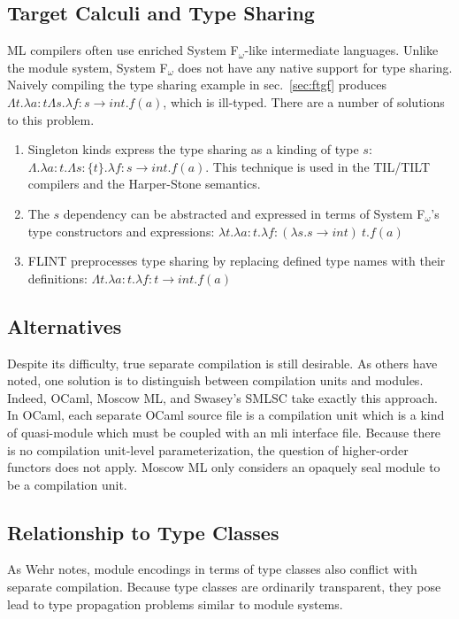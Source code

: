 \subsection{Target Calculi and Type Sharing}
ML compilers often use enriched System F$_\omega$-like intermediate languages. Unlike the module system, System F$_\omega$ does not have any native support for type sharing. Naively compiling the type sharing example in sec.~\ref{sec:ftgf} produces $\Lambda t. \lambda a:t \Lambda s.\lambda f:s\rightarrow int. f(a)$, which is ill-typed. There are a number of solutions to this problem. 
\begin{enumerate}
\item Singleton kinds express the type sharing as a kinding of type $s$: $\Lambda.\lambda a:t.\Lambda s:\{t\}.\lambda f:s\rightarrow int.f(a)$. This technique is used in the TIL/TILT compilers and the Harper-Stone semantics. 
\item The $s$ dependency can be abstracted and expressed in terms of System F$_\omega$'s type constructors and expressions: $\lambda t.\lambda a:t.\lambda f:(\lambda s.s\rightarrow int)~t.f(a)$
\item FLINT preprocesses type sharing by replacing defined type names with their definitions: $\Lambda t.\lambda a:t.\lambda f:t \rightarrow int. f(a)$
\end{enumerate}

\subsection{Alternatives}
Despite its difficulty, true separate compilation is still desirable. As others have noted, one solution is to distinguish between compilation units and modules. Indeed, OCaml, Moscow ML, and Swasey's SMLSC take exactly this approach. In OCaml, each separate OCaml source file is a compilation unit which is a kind of quasi-module which must be coupled with an mli interface file. Because there is no compilation unit-level parameterization, the question of higher-order functors does not apply. Moscow ML only considers an opaquely seal module to be a compilation unit.    

\subsection{Relationship to Type Classes}
As Wehr notes, module encodings in terms of type classes also conflict with separate compilation. Because type classes are ordinarily transparent, they pose lead to type propagation problems similar to module systems.  

